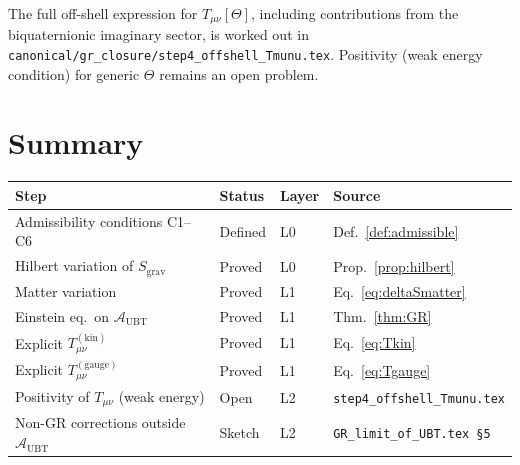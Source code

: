 \documentclass[11pt,a4paper]{article}
\theoremstyle{definition}
\theoremstyle{remark}
\begin{document}
\begin{tcolorbox}[colback=yellow!8!white,colframe=orange!60!black,title=Open item: off-shell completeness]
The full off-shell expression for $T_{\mu\nu}[\Theta]$, including contributions
from the biquaternionic imaginary sector, is worked out in
\texttt{canonical/gr\_closure/step4\_offshell\_Tmunu.tex}.
Positivity (weak energy condition) for generic $\Theta$ remains an open problem.
\end{tcolorbox}

\section{Summary}\label{sec:summary_GR}

\begin{center}
\begin{longtable}{llll}
\toprule
Step & Status & Layer & Source \\
\midrule
Admissibility conditions C1--C6 & Defined & L0 &
  Def.~\ref{def:admissible} \\
Hilbert variation of $S_{\mathrm{grav}}$ & Proved & L0 &
  Prop.~\ref{prop:hilbert} \\
Matter variation & Proved & L1 &
  Eq.~\eqref{eq:deltaSmatter} \\
Einstein eq.\ on $\mathcal{A}_{\mathrm{UBT}}$ & Proved & L1 &
  Thm.~\ref{thm:GR} \\
Explicit $T^{(\mathrm{kin})}_{\mu\nu}$ & Proved & L1 &
  Eq.~\eqref{eq:Tkin} \\
Explicit $T^{(\mathrm{gauge})}_{\mu\nu}$ & Proved & L1 &
  Eq.~\eqref{eq:Tgauge} \\
Positivity of $T_{\mu\nu}$ (weak energy) & Open & L2 &
  \texttt{step4\_offshell\_Tmunu.tex} \\
Non-GR corrections outside $\mathcal{A}_{\mathrm{UBT}}$ & Sketch & L2 &
  \texttt{GR\_limit\_of\_UBT.tex \S5} \\
\bottomrule
\end{longtable}
\end{center}
\end{document}
